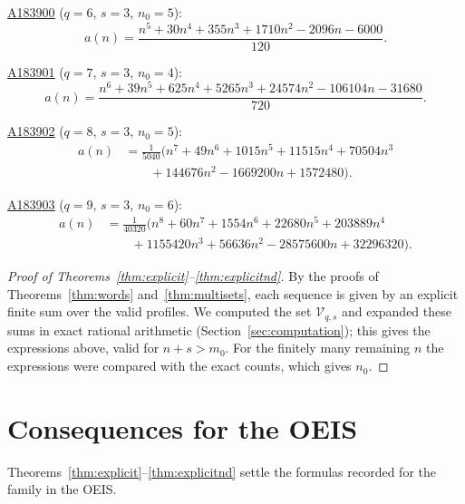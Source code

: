 \documentclass[12pt,reqno]{article}
\newcommand{\seqnum}[1]{\href{https://oeis.org/#1}{\rm \underline{#1}}}
\begin{document}
\begin{theorem}
\noindent\seqnum{A183900} ($q=6$, $s=3$, $n_0 = 5$):
\[ a(n) = \frac{n^{5}+30n^{4}+355n^{3}+1710n^{2}-2096n-6000}{120}. \]

\noindent\seqnum{A183901} ($q=7$, $s=3$, $n_0 = 4$):
\[ a(n) = \frac{n^{6}+39n^{5}+625n^{4}+5265n^{3}+24574n^{2}-106104n-31680}{720}. \]

\noindent\seqnum{A183902} ($q=8$, $s=3$, $n_0 = 5$):
\begin{align*}
a(n) &= \frac{1}{5040}\bigl(n^{7}+49n^{6}+1015n^{5}+11515n^{4}+70504n^{3} \\
&\qquad +144676n^{2}-1669200n+1572480\bigr).
\end{align*}

\noindent\seqnum{A183903} ($q=9$, $s=3$, $n_0 = 6$):
\begin{align*}
a(n) &= \frac{1}{40320}\bigl(n^{8}+60n^{7}+1554n^{6}+22680n^{5}+203889n^{4} \\
&\qquad +1155420n^{3}+56636n^{2}-28575600n+32296320\bigr).
\end{align*}

\end{theorem}

\begin{proof}[Proof of Theorems~\ref{thm:explicit}--\ref{thm:explicitnd}]
By the proofs of Theorems~\ref{thm:words} and~\ref{thm:multisets}, each
sequence is given by an explicit finite sum over the valid profiles. We
computed the set $\mathcal{V}_{q,s}$ and expanded these sums in exact rational
arithmetic (Section~\ref{sec:computation}); this gives the expressions above,
valid for $n + s > m_0$. For the finitely many remaining $n$ the expressions
were compared with the exact counts, which gives $n_0$.
\end{proof}

\section{Consequences for the OEIS}\label{sec:oeis}

Theorems~\ref{thm:explicit}--\ref{thm:explicitnd} settle the formulas
recorded for the family in the OEIS.
\end{document}
